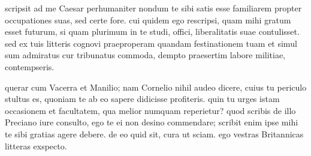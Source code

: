 


 scripsit ad me Caesar perhumaniter nondum te sibi satis esse familiarem propter occupationes suas, sed certe fore. cui quidem ego rescripsi, quam mihi gratum esset futurum, si quam plurimum in te studi, offici, liberalitatis suae contulisset. sed ex tuis litteris cognovi praeproperam quandam festinationem tuam et simul sum admiratus cur tribunatus commoda, dempto praesertim labore militiae, contempseris.

 querar cum Vacerra et Manilio; nam Cornelio nihil audeo dicere, cuius tu periculo stultus es, quoniam te ab eo sapere didicisse profiteris. quin tu urges istam occasionem et facultatem, qua melior numquam reperietur? quod scribis de illo Preciano iure consulto, ego te ei non desino commendare; scribit enim ipse mihi te sibi gratias agere debere. de eo quid sit, cura ut sciam. ego vestras Britannicas litteras exspecto.
